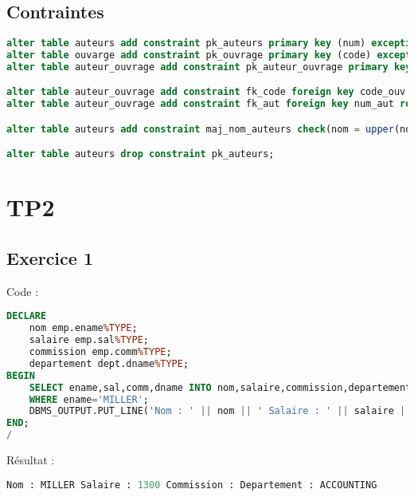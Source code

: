 \documentclass{article}
\begin{document}
\subsection{Contraintes}
\begin{lstlisting}[language=SQL,
    morekeywords={DECLARE, LOOP, TYPE, FOR, IF, IS, OPEN, FETCH, DBMS_OUTPUT, PUT_LINE}]
alter table auteurs add constraint pk_auteurs primary key (num) exceptions into exceptions;
alter table ouvarge add constraint pk_ouvrage primary key (code) exceptions into exceptions;
alter table auteur_ouvrage add constraint pk_auteur_ouvrage primary key (code_ouv, num_aut) exceptions into exceptions;

alter table auteur_ouvrage add constraint fk_code foreign key code_ouv references ouvrage(code) exceptions into exceptions;
alter table auteur_ouvrage add constraint fk_aut foreign key num_aut references auteurs(num) exceptions into exceptions;

alter table auteurs add constraint maj_nom_auteurs check(nom = upper(nom)) exceptions into exceptions;

alter table auteurs drop constraint pk_auteurs;
\end{lstlisting}

\newpage
\section{TP2}

\subsection{Exercice 1}
Code :
\begin{lstlisting}[language=SQL,
    morekeywords={DECLARE, LOOP, TYPE, FOR, IF, IS, OPEN, FETCH, DBMS_OUTPUT, PUT_LINE}]
DECLARE
    nom emp.ename%TYPE;
    salaire emp.sal%TYPE;
    commission emp.comm%TYPE;
    departement dept.dname%TYPE;
BEGIN 
    SELECT ename,sal,comm,dname INTO nom,salaire,commission,departement FROM Emp NATURAL JOIN Dept
    WHERE ename='MILLER';
    DBMS_OUTPUT.PUT_LINE('Nom : ' || nom || ' Salaire : ' || salaire || ' Commission : ' || commission || 'Departement : ' || departement);
END;
/
\end{lstlisting}

Résultat :
\begin{lstlisting}[language=SQL,
    morekeywords={DECLARE, LOOP, TYPE, FOR, IF, IS, OPEN, FETCH, DBMS_OUTPUT, PUT_LINE}]
Nom : MILLER Salaire : 1300 Commission : Departement : ACCOUNTING
\end{lstlisting}
\end{document}
